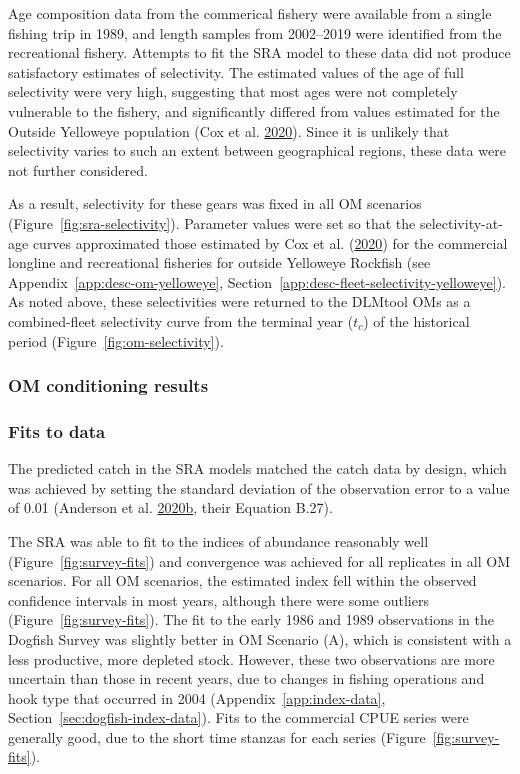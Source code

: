 \documentclass[11pt]{book}
\begin{document}
Age composition data from the commerical fishery were available from a single fishing trip in 1989, and length samples from 2002--2019 were identified from the recreational fishery. Attempts to fit the SRA model to these data did not produce satisfactory estimates of selectivity. The estimated values of the age of full selectivity were very high, suggesting that most ages were not completely vulnerable to the fishery, and significantly differed from values estimated for the Outside Yelloweye population (Cox et al. \protect\hyperlink{ref-cox2020}{2020}). Since it is unlikely that selectivity varies to such an extent between geographical regions, these data were not further considered.

As a result, selectivity for these gears was fixed in all OM scenarios (Figure~\ref{fig:sra-selectivity}). Parameter values were set so that the selectivity-at-age curves approximated those estimated by Cox et al. (\protect\hyperlink{ref-cox2020}{2020}) for the commercial longline and recreational fisheries for outside Yelloweye Rockfish (see Appendix~\ref{app:desc-om-yelloweye}, Section~\ref{app:desc-fleet-selectivity-yelloweye}). As noted above, these selectivities were returned to the DLMtool OMs as a combined-fleet selectivity curve from the terminal year (\(t_c\)) of the historical period (Figure~\ref{fig:om-selectivity}).

\hypertarget{sec:approach3-conditioning-results}{%
\subsubsection{OM conditioning results}\label{sec:approach3-conditioning-results}}

\hypertarget{sec:approach3-conditioning-indices}{%
\subsubsection{Fits to data}\label{sec:approach3-conditioning-indices}}

The predicted catch in the SRA models matched the catch data by design, which was achieved by setting the standard deviation of the observation error to a value of 0.01 (Anderson et al. \protect\hyperlink{ref-anderson2020gfmp}{2020}\protect\hyperlink{ref-anderson2020gfmp}{b}, their Equation B.27).

The SRA was able to fit to the indices of abundance reasonably well (Figure~\ref{fig:survey-fits}) and convergence was achieved for all replicates in all OM scenarios. For all OM scenarios, the estimated index fell within the observed confidence intervals in most years, although there were some outliers (Figure~\ref{fig:survey-fits}). The fit to the early 1986 and 1989 observations in the Dogfish Survey was slightly better in OM Scenario (A), which is consistent with a less productive, more depleted stock. However, these two observations are more uncertain than those in recent years, due to changes in fishing operations and hook type that occurred in 2004 (Appendix~\ref{app:index-data}, Section~\ref{sec:dogfish-index-data}). Fits to the commercial CPUE series were generally good, due to the short time stanzas for each series (Figure~\ref{fig:survey-fits}).
\end{document}
